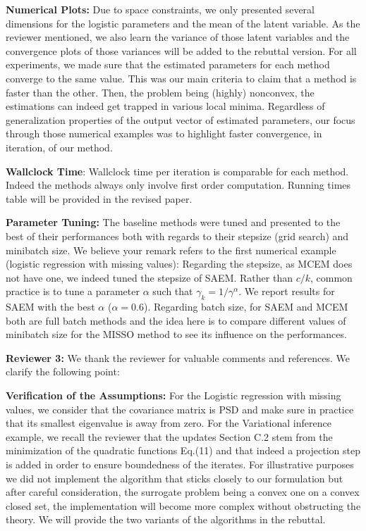 \documentclass{article}
\begin{document}
\textbf{Numerical Plots:} Due to space constraints, we only presented several dimensions for the logistic parameters and the mean of the latent variable. 
As the reviewer mentioned, we also learn the variance of those latent variables and the convergence plots of those variances will be added to the rebuttal version.
For all experiments, we made sure that the estimated parameters for each method converge to the same value. 
This was our main criteria to claim that a method is faster than the other. 
Then, the problem being (highly) nonconvex, the estimations can indeed get trapped in various local minima. 
Regardless of generalization properties of the output vector of estimated parameters, our focus through those numerical examples was to highlight faster convergence, in iteration, of our method.

\textbf{Wallclock Time}:
Wallclock time per iteration is comparable for each method. Indeed the methods always only involve first order computation. 
Running times table will be provided in the revised paper.


\textbf{Parameter Tuning:}
The baseline methods were tuned and presented to the best of their performances both with regards to their stepsize (grid search) and minibatch size.
We believe your remark refers to the first numerical example (logistic regression with missing values): Regarding the stepsize, as MCEM does not have one, we indeed tuned the stepsize of SAEM. Rather than $c/k$, common practice is to tune a parameter $\alpha$ such that $\gamma_k = 1/\gamma^{\alpha}$. We report results for SAEM with the best $\alpha$ ($\alpha = 0.6$). Regarding batch size, for SAEM and MCEM both are full batch methods and the idea here is to compare different values of minibatch size for the MISSO method to see its influence on the performances.\vspace{-0.05in}



\textbf{\textcolor{yellow!80!black}{Reviewer 3:}} We thank the reviewer for valuable comments and references. We clarify the following point:

\textbf{Verification of the Assumptions:} 
For the Logistic regression with missing values, we consider that the covariance matrix is PSD and make sure in practice that its smallest eigenvalue is away from zero.
For the Variational inference example, we recall the reviewer that the updates Section C.2 stem from the minimization of the quadratic functions Eq.(11) and that indeed a projection step is added in order to ensure boundedness of the iterates. For illustrative purposes we did not implement the algorithm that sticks closely to our formulation but after careful consideration, the surrogate problem being a convex one on a convex closed set, the implementation will become more complex without obstructing the theory. We will provide the two variants of the algorithms in the rebuttal. \vspace{-0.05in}
\end{document}
